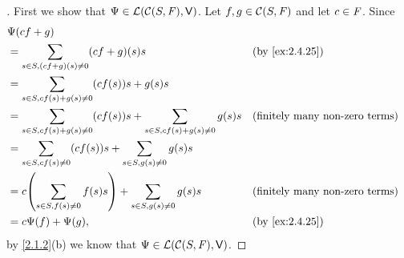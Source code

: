 \begin{proof}[]
  First we show that \(\Psi \in \mathcal{L}(\mathcal{C}(S, \mathit{F}), \mathsf{V})\).
  Let \(f, g \in \mathcal{C}(S, \mathit{F})\) and let \(c \in \mathit{F}\).
  Since
  \begin{align*}
     & \Psi(cf + g)                                                                                                                            \\
     & = \sum_{s \in S, (cf + g)(s) \neq 0} (cf + g)(s) s                                           &  & \text{(by \cref{ex:2.4.25})}          \\
     & = \sum_{s \in S, cf(s) + g(s) \neq 0} (cf(s)) s + g(s) s                                                                                \\
     & = \sum_{s \in S, cf(s) + g(s) \neq 0} (cf(s)) s + \sum_{s \in S, cf(s) + g(s) \neq 0} g(s) s &  & \text{(finitely many non-zero terms)} \\
     & = \sum_{s \in S, cf(s) \neq 0} (cf(s)) s + \sum_{s \in S, g(s) \neq 0} g(s) s                                                           \\
     & = c \pa{\sum_{s \in S, f(s) \neq 0} f(s) s} + \sum_{s \in S, g(s) \neq 0} g(s) s             &  & \text{(finitely many non-zero terms)} \\
     & = c \Psi(f) + \Psi(g),                                                                       &  & \text{(by \cref{ex:2.4.25})}
  \end{align*}
  by \cref{2.1.2}(b) we know that \(\Psi \in \mathcal{L}(\mathcal{C}(S, \mathit{F}), \mathsf{V})\).


\end{proof}
